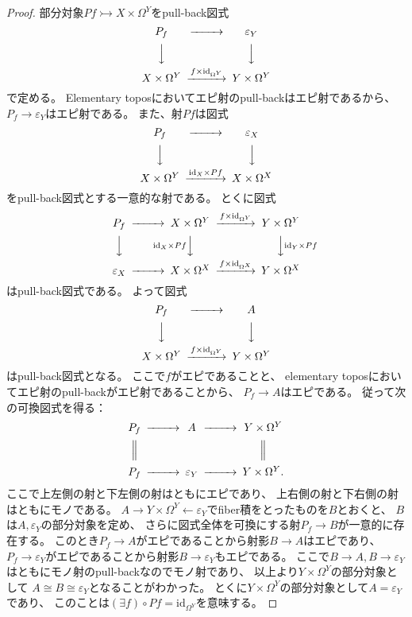 \documentclass[uplatex]{jsarticle}
\theoremstyle{definition}
\def\ep{\varepsilon}
\def\id{\mathrm{id}}
\newcommand{\rtot}{\rightarrowtail}
\begin{document}
\begin{proof}
  部分対象\(Pf\rtot X\times \Omega^Y\)をpull-back図式
  \[
  \begin{CD}
    P_f @>>> \ep_Y \\
    @VVV @VVV \\
    X\times \Omega^Y @> f \times \id_{\Omega^Y} >> Y\times \Omega^Y
  \end{CD}
  \]
  で定める。
  Elementary toposにおいてエピ射のpull-backはエピ射であるから、
  \(P_f\to \ep_Y\)はエピ射である。
  また、射\(Pf\)は図式
  \[
  \begin{CD}
    P_f @>>> \ep_X \\
    @VVV @VVV \\
    X\times \Omega^Y @> \id_X \times Pf >> X\times \Omega^X
  \end{CD}
  \]
  をpull-back図式とする一意的な射である。
  とくに図式
  \[
  \begin{CD}
    P_f @>>> X\times \Omega^Y @> f\times \id_{\Omega^Y} >> Y\times \Omega^Y \\
    @VVV @V \id_X \times Pf VV @VV \id_Y \times Pf V \\
    \ep_X @>>> X\times \Omega^X @> f\times \id_{\Omega^X} >> Y\times \Omega^X
  \end{CD}
  \]
  はpull-back図式である。
  よって図式
  \[
  \begin{CD}
    P_f @>>> A \\
    @VVV @VVV \\
    X\times \Omega^Y @> f\times \id_{\Omega^Y} >> Y\times \Omega^Y
  \end{CD}
  \]
  はpull-back図式となる。
  ここで\(f\)がエピであることと、
  elementary toposにおいてエピ射のpull-backがエピ射であることから、
  \(P_f \to A\)はエピである。
  従って次の可換図式を得る：
  \[
  \begin{CD}
    P_f @>>> A @>>> Y\times \Omega^Y \\
    @| @. @| \\
    P_f @>>> \ep_Y @>>> Y\times \Omega^Y.
  \end{CD}
  \]
  ここで上左側の射と下左側の射はともにエピであり、
  上右側の射と下右側の射はともにモノである。
  \(A\to Y\times \Omega^Y \gets \ep_Y\)でfiber積をとったものを\(B\)とおくと、
  \(B\)は\(A,\ep_Y\)の部分対象を定め、
  さらに図式全体を可換にする射\(P_f\to B\)が一意的に存在する。
  このとき\(P_f\to A\)がエピであることから射影\(B\to A\)はエピであり、
  \(P_f\to \ep_Y\)がエピであることから射影\(B\to \ep_Y\)もエピである。
  ここで\(B\to A, B\to \ep_Y\)はともにモノ射のpull-backなのでモノ射であり、
  以上より\(Y\times \Omega^Y\)の部分対象として
  \(A\cong B \cong \ep_Y\)となることがわかった。
  とくに\(Y\times \Omega^Y\)の部分対象として\(A = \ep_Y\)であり、
  このことは\((\exists f)\circ Pf = \id_{\Omega^Y}\)を意味する。


\end{proof}
\end{document}
